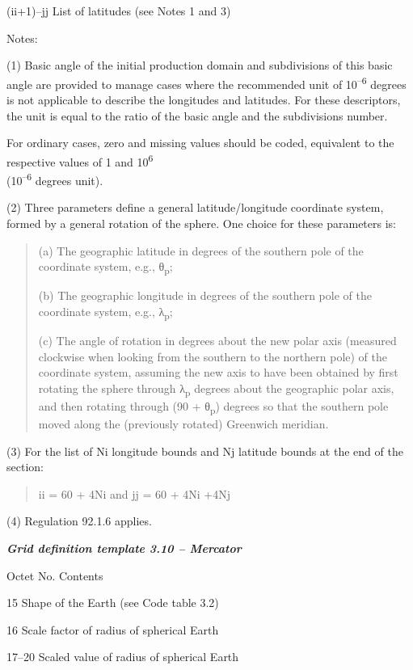 (ii+1)--jj List of latitudes (see Notes 1 and 3)

Notes:

(1) Basic angle of the initial production domain and subdivisions of this basic angle are provided to manage cases where the recommended unit of 10\textsuperscript{--6} degrees is not applicable to describe the longitudes and latitudes. For these descriptors, the unit is equal to the ratio of the basic angle and the subdivisions number.

For ordinary cases, zero and missing values should be coded, equivalent to the respective values of 1 and 10\textsuperscript{6}\\
(10\textsuperscript{--6} degrees unit).

(2) Three parameters define a general latitude/longitude coordinate system, formed by a general rotation of the sphere. One choice for these parameters is:

\begin{quote}
(a) The geographic latitude in degrees of the southern pole of the coordinate system, e.g., θ\textsubscript{p};

(b) The geographic longitude in degrees of the southern pole of the coordinate system, e.g., λ\textsubscript{p};

(c) The angle of rotation in degrees about the new polar axis (measured clockwise when looking from the southern to the northern pole) of the coordinate system, assuming the new axis to have been obtained by first rotating the sphere through λ\textsubscript{p} degrees about the geographic polar axis, and then rotating through (90 + θ\textsubscript{p}) degrees so that the southern pole moved along the (previously rotated) Greenwich meridian.
\end{quote}

(3) For the list of Ni longitude bounds and Nj latitude bounds at the end of the section:

\begin{quote}
ii = 60 + 4Ni and jj = 60 + 4Ni +4Nj
\end{quote}

(4) Regulation 92.1.6 applies.

\emph{\textbf{Grid definition template 3.10 -- Mercator}}

Octet No. Contents

15 Shape of the Earth (see Code table 3.2)

16 Scale factor of radius of spherical Earth

17--20 Scaled value of radius of spherical Earth


